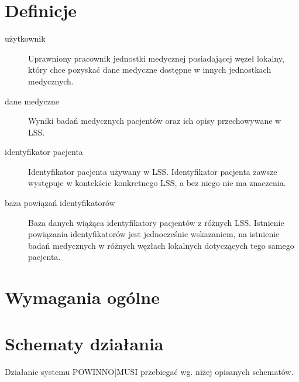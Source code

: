 \documentclass[a4paper]{report}
\begin{document}
\section{Definicje}
\begin{description}
\item[użytkownik] Uprawniony pracownik jednostki medycznej posiadającej węzeł lokalny, który chce pozyskać dane
      medyczne dostępne w innych jednostkach medycznych.
\item[dane medyczne] Wyniki badań medycznych pacjentów oraz ich opisy przechowywane w LSS.
\item[identyfikator pacjenta] Identyfikator pacjenta używany w LSS. Identyfikator pacjenta zawsze występuje w kontekście
      konkretnego LSS, a bez niego nie ma znaczenia.
\item[baza powiązań identyfikatorów] Baza danych wiążąca identyfikatory pacjentów z różnych LSS. Istnienie powiązania
      identyfikatorów jest jednocześnie wskazaniem, na istnienie badań medycznych w różnych węzłach lokalnych dotyczących
      tego samego pacjenta.
\end{description}

\section{Wymagania ogólne}



\section{Schematy działania}

Działanie systemu POWINNO|MUSI przebiegać wg. niżej opisanych schematów.
\end{document}
